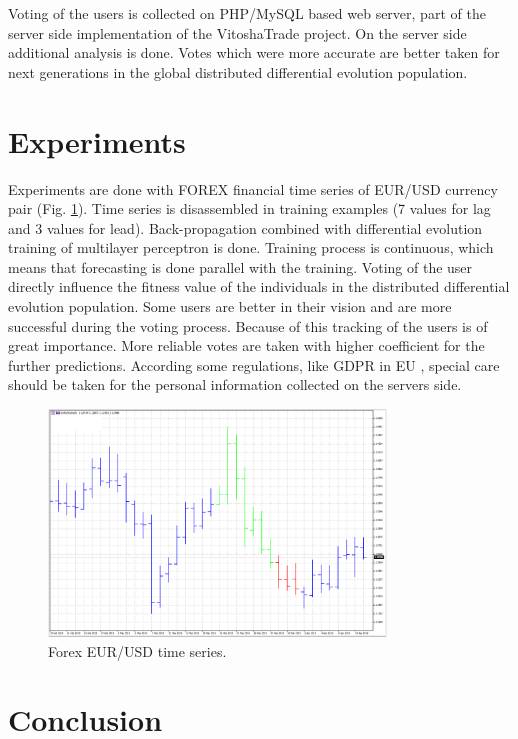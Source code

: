 \documentclass[11pt]{article}
\begin{document}
Voting of the users is collected on PHP/MySQL based web server\cite{tomov01}, part of the server side implementation of the VitoshaTrade project. On the server side additional analysis is done. Votes which were more accurate are better taken for next generations in the global distributed differential evolution population. 

\section{Experiments} \label{Experiments}

Experiments are done with FOREX financial time series of EUR/USD currency pair (Fig. \ref{fig03}). Time series is disassembled in training examples (7 values for lag and 3 values for lead). Back-propagation combined with differential evolution training of multilayer perceptron is done. Training process is continuous, which means that forecasting is done parallel with the training. Voting of the user directly influence the fitness value of the individuals in the distributed differential evolution population. Some users are better in their vision and are more successful during the voting process. Because of this tracking of the users is of great importance. More reliable votes are taken with higher coefficient for the further predictions. According some regulations, like GDPR in EU \cite{hristov01}, special care should be taken for the personal information collected on the servers side. 

\begin{figure}
\includegraphics[width=0.8\textwidth]{fig03.png}
\centering
\caption{Forex EUR/USD time series.} \label{fig03}
\end{figure}
\FloatBarrier

\section{Conclusion} \label{Conclusion}
\end{document}
